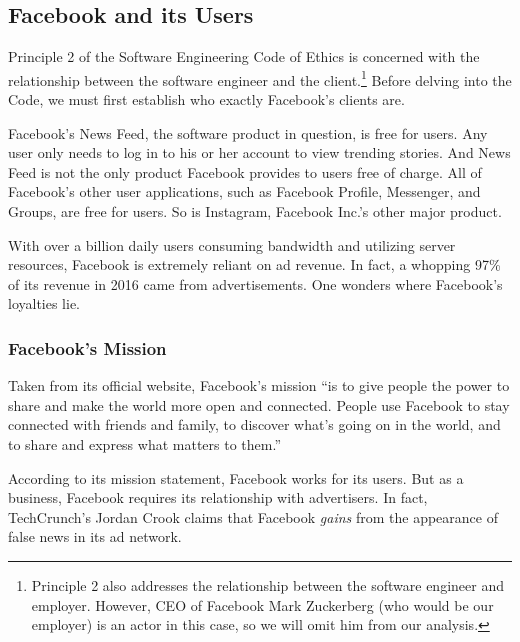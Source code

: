 
\subsection{Facebook and its Users}

\par Principle 2 of the Software Engineering Code of Ethics is concerned with the relationship between the software engineer and the client.\footnote{Principle 2 also addresses the relationship between the software engineer and employer. However, CEO of Facebook Mark Zuckerberg (who would be our employer) is an actor in this case, so we will omit him from our analysis.} \cite{se_code} Before delving into the Code, we must first establish who exactly Facebook's clients are.

\par Facebook's News Feed, the software product in question, is free for users. Any user only needs to log in to his or her account to view trending stories. And News Feed is not the only product Facebook provides to users free of charge. All of Facebook's other user applications, such as Facebook Profile, Messenger, and Groups, are free for users. So is Instagram, Facebook Inc.'s other major product. \cite{fb_newsroom}

\par With over a billion daily users consuming bandwidth and utilizing server resources, Facebook is extremely reliant on ad revenue. In fact, a whopping 97\% of its revenue in 2016 came from advertisements. \cite{fb_4q2016} One wonders where Facebook's loyalties lie.

\subsubsection{Facebook's Mission}\label{mission}

\par Taken from its official website, Facebook's mission ``is to give people the power to share and make the world more open and connected. People use Facebook to stay connected with friends and family, to discover what’s going on in the world, and to share and express what matters to them.'' \cite{fb_newsroom}

\par According to its mission statement, Facebook works for its users. But as a business, Facebook requires its relationship with advertisers. In fact, TechCrunch's Jordan Crook claims that Facebook \emph{gains} from the appearance of false news in its ad network.  \cite{tc_responsibility}

